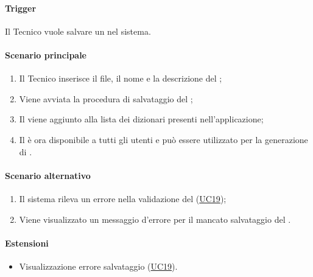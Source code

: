 \paragraph*{Trigger}
Il Tecnico vuole salvare un  nel sistema.

\paragraph*{Scenario principale}
\begin{enumerate}
  \item Il Tecnico inserisce il file, il nome e la descrizione del ;
  \item Viene avviata la procedura di salvataggio del ;
  \item Il  viene aggiunto alla lista dei dizionari presenti nell'applicazione;
  \item Il  è ora disponibile a tutti gli utenti e può essere utilizzato per la generazione di .
\end{enumerate}

\paragraph*{Scenario alternativo}
\begin{enumerate}
  \item Il sistema rileva un errore nella validazione del  (\hyperref[UC19]{UC19});
  \item Viene visualizzato un messaggio d'errore per il mancato salvataggio del .
\end{enumerate}

\paragraph*{Estensioni}
\begin{itemize}
  \item Visualizzazione errore salvataggio  (\hyperref[UC19]{UC19}).
\end{itemize}
